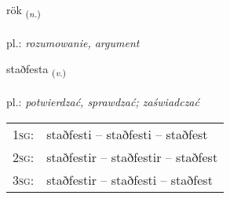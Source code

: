 \documentclass[frontgrid, backgrid]{flacards}\usepackage[]{graphicx}\usepackage[]{xcolor}
\begin{document}
\renewcommand{\flhead}{\vskip5pt \fboxsep=0pt {\small\bfseries\footnotesize Nafnorð | Noun}}
\renewcommand{\fcfoot}{\vskip5pt \fboxsep=0pt \hspace{2pt}{\small\bfseries\footnotesize 1K}}

\renewcommand{\blhead}{\vskip5pt {\small\bfseries\footnotesize Nafnorð | Noun }}
\renewcommand{\bcfoot}{\vskip5pt \hspace{2pt}{\small\bfseries\footnotesize 1K}}


{rök \small{\textsubscript{(\textit{n.})}} \\[1ex] %
\textphonetic{[rœːk]} \\
pl.: \emph{rozumowanie, argument} \\  [2ex]
\renewcommand*{\arraystretch}{0.8}
}

\renewcommand{\flhead}{\vskip5pt \fboxsep=0pt {\small\bfseries\footnotesize Sagnorð | Verb}}
\renewcommand{\fcfoot}{\vskip5pt \fboxsep=0pt \hspace{2pt}{\small\bfseries\footnotesize 1K}}

\renewcommand{\blhead}{\vskip5pt {\small\bfseries\footnotesize Sagnorð | Verb }}
\renewcommand{\bcfoot}{\vskip5pt \hspace{2pt}{\small\bfseries\footnotesize 1K}}


{staðfesta \small{\textsubscript{(\textit{v.})}} \\[1ex] %
\textphonetic{[staðfɛsta]} \\
pl.: \emph{potwierdzać, sprawdzać; zaświadczać} \\  [2ex]
\renewcommand*{\arraystretch}{0.8}
\begin{tabular}{p{1cm}l}
\textsc{1sg}: & staðfesti -- staðfesti -- staðfest \\ 
\textsc{2sg}: & staðfestir -- staðfestir -- staðfest \\ 
\textsc{3sg}: & staðfestir -- staðfesti -- staðfest \\ 
\end{tabular}
}
\end{document}
